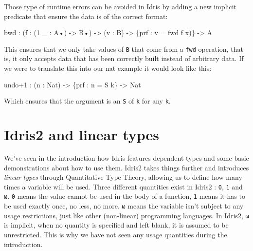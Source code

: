 \documentclass[
]{article}
\newenvironment{Shaded}{}{}
\newcommand{\DataTypeTok}[1]{\textcolor[rgb]{0.56,0.13,0.00}{#1}}
\newcommand{\DecValTok}[1]{\textcolor[rgb]{0.25,0.63,0.44}{#1}}
\newcommand{\NormalTok}[1]{#1}
\newcommand{\OperatorTok}[1]{\textcolor[rgb]{0.40,0.40,0.40}{#1}}
\newcommand{\OtherTok}[1]{\textcolor[rgb]{0.00,0.44,0.13}{#1}}
\begin{document}
Those type of runtime errors can be avoided in Idris by adding a new
implicit predicate that ensure the data is of the correct format:

\begin{Shaded}
\begin{Highlighting}[]
\NormalTok{bwd }\OperatorTok{:}\NormalTok{ (f }\OperatorTok{:}\NormalTok{ (}\DecValTok{1}\NormalTok{ \_ }\OperatorTok{:} \DataTypeTok{A}\NormalTok{•) }\OtherTok{{-}\textgreater{}} \DataTypeTok{B}\NormalTok{•) }\OtherTok{{-}\textgreater{}}\NormalTok{ (v }\OperatorTok{:} \DataTypeTok{B}\NormalTok{) }\OtherTok{{-}\textgreater{}}\NormalTok{ \{prf }\OperatorTok{:}\NormalTok{ v }\OtherTok{=}\NormalTok{ fwd f x)\} }\OtherTok{{-}\textgreater{}} \DataTypeTok{A}
\end{Highlighting}
\end{Shaded}

This ensures that we only take values of \texttt{B} that come from a
\texttt{fwd} operation, that is, it only accepts data that has been
correctly built instead of arbitrary data. If we were to translate this
into our nat example it would look like this:

\begin{Shaded}
\begin{Highlighting}[]
\NormalTok{undo}\OperatorTok{+}\DecValTok{1} \OperatorTok{:}\NormalTok{ (n }\OperatorTok{:} \DataTypeTok{Nat}\NormalTok{) }\OtherTok{{-}\textgreater{}}\NormalTok{ \{prf }\OperatorTok{:}\NormalTok{ n }\OtherTok{=} \DataTypeTok{S}\NormalTok{ k\} }\OtherTok{{-}\textgreater{}} \DataTypeTok{Nat}
\end{Highlighting}
\end{Shaded}

Which ensures that the argument is an \texttt{S} of \texttt{k} for any
\texttt{k}.

\newpage

\hypertarget{idris2-and-linear-types}{%
\section{Idris2 and linear types}\label{idris2-and-linear-types}}

We've seen in the introduction how Idris features dependent types and
some basic demonstrations about how to use them. Idris2 takes things
further and introduces \emph{linear types} through Quantitative Type
Theory, allowing us to define how many times a variable will be used.
Three different quantities exist in Idris2 : \texttt{0}, \texttt{1} and
\texttt{ω}. \texttt{0} means the value cannot be used in the body of a
function, \texttt{1} means it has to be used exactly once, no less, no
more. \texttt{ω} means the variable isn't subject to any usage
restrictions, just like other (non-linear) programming languages. In
Idris2, \texttt{ω} is implicit, when no quantity is specified and left
blank, it is assumed to be unrestricted. This is why we have not seen
any usage quantities during the introduction.
\end{document}
